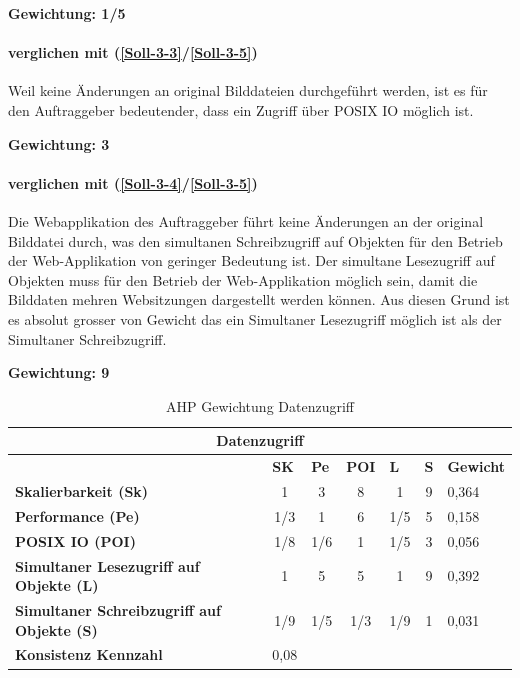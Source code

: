 \textbf{Gewichtung: 1/5}


\paragraph*{ verglichen mit  (\ref{Soll-3-3}/\ref{Soll-3-5})}
Weil keine Änderungen an original Bilddateien durchgeführt werden, ist es für den Auftraggeber bedeutender, dass ein Zugriff über POSIX IO möglich ist.

\textbf{Gewichtung: 3}


\paragraph*{ verglichen mit  (\ref{Soll-3-4}/\ref{Soll-3-5})}
Die Webapplikation des Auftraggeber führt keine Änderungen an der original Bilddatei durch, was den simultanen Schreibzugriff auf Objekten für den Betrieb der Web-Applikation von geringer Bedeutung ist. Der simultane Lesezugriff auf Objekten muss für den Betrieb der Web-Applikation möglich sein, damit die Bilddaten mehren Websitzungen dargestellt werden können. Aus diesen Grund ist es absolut grosser von Gewicht das ein Simultaner Lesezugriff möglich ist als der Simultaner Schreibzugriff.

\textbf{Gewichtung: 9}

\begin{table}[htbp]
\caption{AHP Gewichtung Datenzugriff}
\begin{tabular}{|l|c|c|c|c|c|l|}
\hline
\multicolumn{ 7}{|c|}{\textbf{Datenzugriff}} \\ \hline
 & \multicolumn{1}{l|}{\textbf{SK}} & \multicolumn{1}{l|}{\textbf{Pe}} & \multicolumn{1}{l|}{\textbf{POI}} & \multicolumn{1}{l|}{\textbf{L}} & \multicolumn{1}{l|}{\textbf{S}} & \multicolumn{1}{l|}{\textbf{Gewicht}} \\ \hline
\textbf{Skalierbarkeit (Sk)} & 1 & 3 & 8 & 1 & 9 & 0,364 \\ \hline
\textbf{Performance (Pe)} & 1/3 & 1 & 6 & 1/5 & 5 & 0,158 \\ \hline
\textbf{POSIX IO (POI)} & 1/8 & 1/6 & 1 & 1/5 & 3 & 0,056 \\ \hline
\textbf{Simultaner Lesezugriff auf Objekte (L)} & 1 & 5 & 5 & 1 & 9 & 0,392 \\ \hline
\textbf{Simultaner Schreibzugriff auf Objekte (S)} & 1/9 & 1/5 & 1/3 & 1/9 & 1 & 0,031 \\ \hline
\textbf{Konsistenz Kennzahl} & 0,08 \\ \cline{1-2}
\end{tabular}
\label{tab:AHPDatenzugriff}
\end{table}

